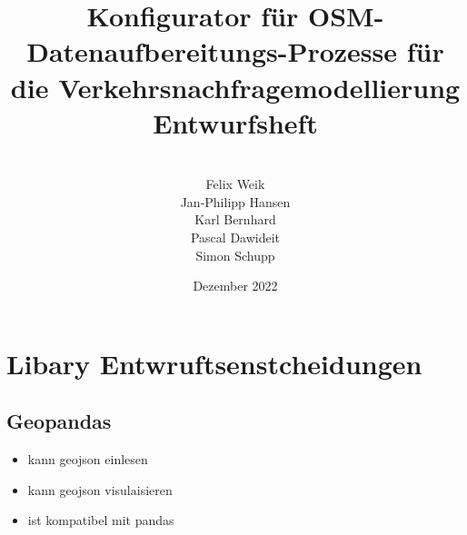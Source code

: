 \documentclass[parskip=full]{scrartcl} %
\title{Konfigurator für OSM-Datenaufbereitungs-Prozesse für die Verkehrsnachfragemodellierung \\ \vspace{2mm}\large{}Entwurfsheft}
\author{
\vspace{5mm}\\
Felix Weik\\ Jan-Philipp Hansen\\ Karl Bernhard\\ Pascal Dawideit\\ Simon Schupp}
\date{Dezember 2022}
\begin{document}
\maketitle
\newpage

\section{Libary Entwruftsenstcheidungen}

\subsection{Geopandas}
\begin{itemize}
    \item kann geojson einlesen
    \item kann geojson visulaisieren
    \item ist kompatibel mit pandas
\end{itemize}
\end{document}
